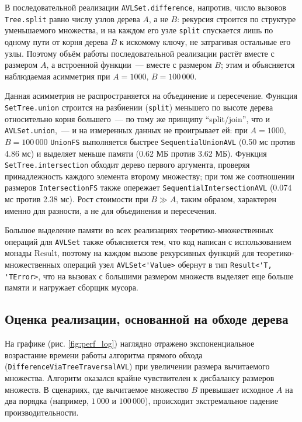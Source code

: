\documentclass[a4paper,12pt]{article}
\begin{document}
В последовательной реализации \verb|AVLSet.difference|, напротив, число вызовов \verb|Tree.split| равно числу узлов дерева $A$, а не $B$: рекурсия строится по структуре уменьшаемого множества, и на каждом его узле \verb|split| спускается лишь по одному пути от корня дерева $B$ к искомому ключу, не затрагивая остальные его узлы. Поэтому объём работы последовательной реализации растёт вместе с размером $A$, а встроенной функции~--- вместе с размером $B$; этим и объясняется наблюдаемая асимметрия при $A=1000,\,B=100\,000$.

Данная асимметрия не распространяется на объединение и пересечение. Функция \verb|SetTree.union| строится на разбиении (\verb|split|) меньшего по высоте дерева относительно корня большего~--- по тому же принципу \enquote{split/join}, что и \verb|AVLSet.union|,~--- и на измеренных данных не проигрывает ей: при $A=1000$, $B=100\,000$ \verb|UnionFS| выполняется быстрее \verb|SequentialUnionAVL| (0.50 мс против 4.86 мс) и выделяет меньше памяти (0.62 МБ против 3.62 МБ). Функция \verb|SetTree.intersection| обходит дерево первого аргумента, проверяя принадлежность каждого элемента второму множеству; при том же соотношении размеров \verb|IntersectionFS| также опережает \verb|SequentialIntersectionAVL| (0.074 мс против 2.38 мс). Рост стоимости при $B \gg A$, таким образом, характерен именно для разности, а не для объединения и пересечения.

Большое выделение памяти во всех реализациях теоретико-множественных операций для \verb|AVLSet| также объясняется тем, что код написан с использованием монады Result, поэтому на каждом вызове рекурсивных функций для теоретико-множественных операций узел \verb|AVLSet<'Value>| обернут в тип \verb|Result<'T, 'TError>|, что на вызовах с большими размером множеств выделяет еще больше памяти и нагружает сборщик мусора.

\subsection{Оценка реализации, основанной на обходе дерева}
На графике (рис. \ref{fig:perf_log}) наглядно отражено экспоненциальное возрастание времени работы алгоритма прямого обхода (\verb|DifferenceViaTreeTraversalAVL|) при увеличении размера вычитаемого множества. Алгоритм оказался крайне чувствителен к дисбалансу размеров множеств. В сценариях, где вычитаемое множество $B$ превышает исходное $A$ на два порядка (например, $1\,000$ и $100\,000$), происходит экстремальное падение производительности. 
\end{document}
